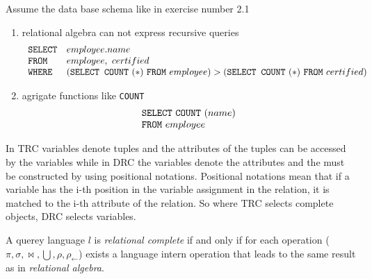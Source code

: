\begin{exercise}{10} 
\begin{subexercise}
  Assume the data base schema like in exercise number 2.1
  \begin{enumerate}
    \item relational algebra can not express recursive queries
      \begin{displaymath}
        \begin{array}{l l}
          \text{\texttt{SELECT}} &employee.name \\
          \text{\texttt{FROM}}& employee, \,\, certified\\
          \text{\texttt{WHERE}}&(\text{\texttt{SELECT COUNT}}\,\,(*) \,\,
          \text{\texttt{FROM}}\,\, employee) > (\text{\texttt{SELECT COUNT}}\,\,(*) \,\,
          \text{\texttt{FROM}}\,\, certified)
        \end{array}
      \end{displaymath}
    \item agrigate functions like \texttt{COUNT}
      \begin{displaymath}
        \begin{array}{l}
          \text{\texttt{SELECT}} \,\, \text{\texttt{COUNT}}\,\,(name)\\
          \text{\texttt{FROM}}\,\, employee\\
        \end{array}
      \end{displaymath}
  \end{enumerate}
\end{subexercise}

\begin{subexercise}
  In TRC variables denote tuples and the attributes of the tuples can be
  accessed by the variables while in DRC the variables denote the attributes and
  the must be constructed by using positional notations. Positional notations
  mean that if a variable has the i-th position in the variable assignment in
  the relation, it is matched to the i-th attribute of the relation. So where TRC selects
  complete objects, DRC selects variables.
\end{subexercise}

\begin{subexercise}
  A querey language $l$ is \emph{relational complete} if and only if for each
  operation ($\pi, \sigma, \bowtie, \bigcup, \rho, \rho_{ \leftarrow}$) exists a
  language intern operation that leads to the same result as in \emph{relational
  algebra}.
  

\end{subexercise}
\end{exercise}

